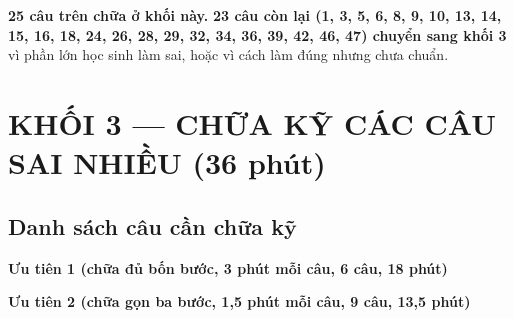 \documentclass[11pt, a4paper]{article}
\begin{document}
\textbf{25 câu trên chữa ở khối này.} \textbf{23 câu còn lại (1, 3, 5, 6, 8, 9, 10, 13, 14, 15, 16, 18, 24, 26, 28, 29, 32, 34, 36, 39, 42, 46, 47) chuyển sang khối 3} vì phần lớn học sinh làm sai, hoặc vì cách làm đúng nhưng chưa chuẩn.

\section{KHỐI 3 — CHỮA KỸ CÁC CÂU SAI NHIỀU (36 phút)}

\subsection{Danh sách câu cần chữa kỹ}

\textbf{Ưu tiên 1 (chữa đủ bốn bước, 3 phút mỗi câu, 6 câu, 18 phút)}


\textbf{Ưu tiên 2 (chữa gọn ba bước, 1,5 phút mỗi câu, 9 câu, 13,5 phút)}
\end{document}
